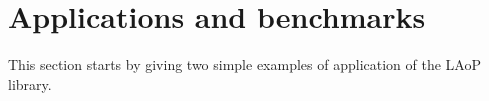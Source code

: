 \documentclass[sigplan,screen]{acmart}\settopmatter{}
\def\start{&&}
\def\more{\\&&}
\begin{document}
\section{Applications and benchmarks}\label{sec-appl}
This section starts by giving two simple examples of application of the LAoP library.

%
%
%
%
\end{document}
